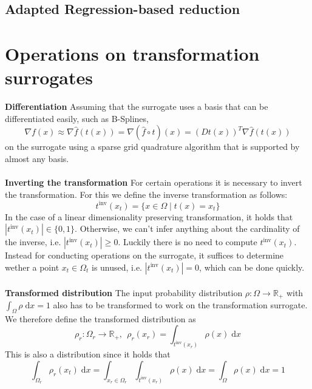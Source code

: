 \documentclass[
  a4paper,  %
  twoside,  %
  bibliography=totoc,
  headsepline,
  cleardoublepage=empty,
  parskip=half,
  draft=false
]{scrbook}
\begin{document}
\subsection{Adapted Regression-based reduction}

\section{Operations on transformation surrogates}


\textbf{Differentiation }
Assuming that the surrogate uses a basis that can be differentiated easily, such as B-Splines, 
\begin{equation}
\nabla f(x) \approx \nabla \hat{f}(t(x)) = \nabla (\hat{f} \circ t)(x)=(Dt(x))^T \nabla \hat{f}(t(x))
\end{equation}
on the surrogate using a sparse grid quadrature algorithm that is supported by almost any basis.
\\
\\
\textbf{Inverting the transformation  }
For certain operations it is necessary to invert the transformation.
For this we define the inverse transformation as follows:
\begin{equation}
t^{\text{inv}}(x_{t})=\{x \in \Omega \mid t(x)=x_{t}\}
\end{equation}
In the case of a linear dimensionality preserving transformation, it holds that $|t^{\text{inv}}(x_{t})| \in \{0,1\}$.
Otherwise, we can't infer anything about the cardinality of the inverse, i.e. $|t^{\text{inv}}(x_{t})| \geq 0$.
Luckily there is no need to compute $t^{\text{inv}}(x_{t})$. Instead for conducting operations on the surrogate, it suffices to determine wether a point $x_t \in \Omega_t$ is unused, i.e. $|t^{\text{inv}}(x_{t})| = 0$, which can be done quickly.
\\
\\
\textbf{Transformed distribution}
The input probability distribution $\rho \colon \Omega \to \mathds{R_+}$ with $\int_{\Omega} \rho \; \text{d}x = 1$ also has to be transformed to work on the transformation surrogate.
We therefore define the transformed distribution as
\begin{equation}
\rho_r \colon \Omega_r \to \mathds{R_+}, ~~ \rho_r(x_r)=\int_{t^{\text{inv}}(x_r)} \rho(x) \; \text{d}x 
\end{equation}
This is also a distribution since it holds that
\begin{equation}
\int_{\Omega_r} \rho_r(x_t) \; \text{d}x=\int_{x_r \in \Omega_r} \int_{t^{\text{inv}}(x_r)} \rho(x) \; \text{d}x = \int_{\Omega} \rho(x) \; \text{d}x = 1
\end{equation}
\end{document}
